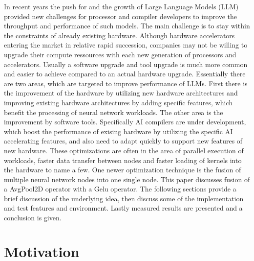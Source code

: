 \documentclass[letterpaper]{article}
\begin{document}
In recent years the push for and the growth of Large Language Models (LLM) provided new challenges for processor and compiler developers to improve the throughput and performance of such models. The main challenge is to stay within the constraints of already existing hardware. Although hardware accelerators entering the market in relative rapid succession, companies may not be willing to upgrade their compute ressources with each new generation of processors and accelerators. Usually a software upgrade and tool upgrade is much more common and easier to achieve compared to an actual hardware upgrade.  
Essentially there are two areas, which are targeted to improve performance of LLMs. First there is the improvement of the hardware by utilizing new hardware architectures and improving existing hardware architectures by adding specific features, which benefit the processing of neural network workloads. The other area is the improvement by software tools. Specifically AI compilers are under development, which boost the performance of exising hardware by utilizing the specific AI accelerating features, and also need to adapt quickly to support new features of new hardware. These optimizations are often in the area of parallel execution of workloads, faster data transfer between nodes and faster loading of kernels into the hardware to name a few. 
One newer optimization technique is the fusion of multiple neural network nodes into one single node. This paper discusses fusion of a AvgPool2D operator with a Gelu operator. The following sections provide a brief discussion of the underlying idea, then discuss some of the implementation and test features and environment. Lastly measured results are presented and a conclusion is given. 

\section{Motivation} 
\end{document}
